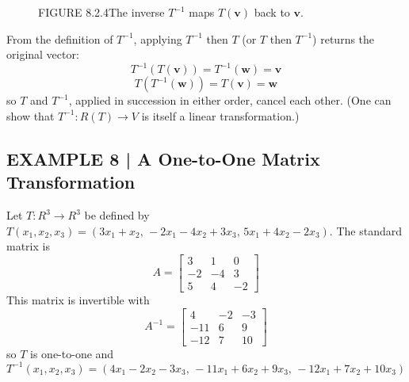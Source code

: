 \documentclass{article}
\begin{document}
\begin{figure}[ht]
\centering
{}
\caption*{FIGURE 8.2.4\quad The inverse $T^{-1}$ maps $T(\mathbf{v})$ back to $\mathbf{v}$.}
\end{figure}

From the definition of $T^{-1}$, applying $T^{-1}$ then $T$ (or $T$ then $T^{-1}$) returns
the original vector:
\begin{equation}
  T^{-1}(T(\mathbf{v})) = T^{-1}(\mathbf{w}) = \mathbf{v} \tag{1}
\end{equation}
\begin{equation}
  T(T^{-1}(\mathbf{w})) = T(\mathbf{v}) = \mathbf{w} \tag{2}
\end{equation}
so $T$ and $T^{-1}$, applied in succession in either order, cancel each other.
(One can show that $T^{-1} : R(T) \to V$ is itself a linear transformation.)

\subsection*{EXAMPLE 8 | A One-to-One Matrix Transformation}

Let $T : R^3 \to R^3$ be defined by $T(x_1,x_2,x_3) = (3x_1+x_2,\,-2x_1-4x_2+3x_3,\,5x_1+4x_2-2x_3)$.
The standard matrix is
\[
  A = \begin{bmatrix}3&1&0\\-2&-4&3\\5&4&-2\end{bmatrix}
\]
This matrix is invertible with
\[
  A^{-1} = \begin{bmatrix}4&-2&-3\\-11&6&9\\-12&7&10\end{bmatrix}
\]
so $T$ is one-to-one and
\[
  T^{-1}(x_1,x_2,x_3) = (4x_1-2x_2-3x_3,\,-11x_1+6x_2+9x_3,\,-12x_1+7x_2+10x_3)
\]
\end{document}
